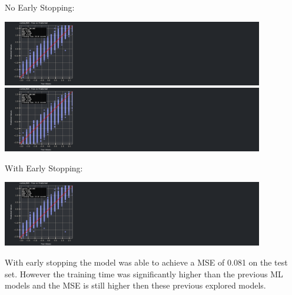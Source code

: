 \documentclass{assignment}
\begin{document}
No Early Stopping:
\begin{center}
    \includegraphics[width=4.5in,trim={0 0 30cm 0},clip]{../report/assets/nn4_best_models_result.pdf}
    \includegraphics[width=4.5in,trim={0 0 30cm 0},clip]{../report/assets/nn5_best_models_result.pdf}
\end{center}
With Early Stopping:
\begin{center}
    \includegraphics[width=4.5in,trim={0 0 30cm 0},clip]{../report/assets/nn8_best_models_result.pdf}
\end{center}

With early stopping the model was able to achieve a MSE of 0.081 on the test set. 
However the training time was significantly higher than the previous ML models and the MSE is still higher then these previous explored models.
\end{document}
